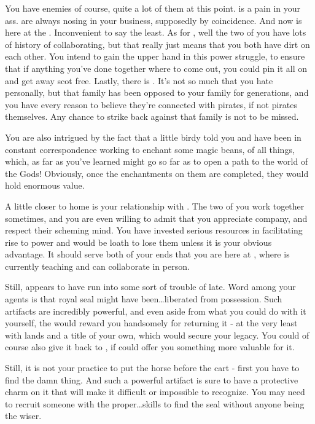 \documentclass[char]{GL2020}
\begin{document}
You have enemies of course, quite a lot of them at this point. \cInterpol{} is a pain in your ass. \cInterpol{\They} are always nosing in your business, supposedly by coincidence. And now \cInterpol{} is here at the \pSc{}. Inconvenient to say the least. As for \cDiplomat{}, well the two of you have lots of history of collaborating, but that really just means that you both have dirt on each other. You intend to gain the upper hand in this power struggle, to ensure that if anything you’ve done together where to come out, you could pin it all on \cDiplomat{} and get away scot free. Lastly, there is \cJuniorStatesman{}. It’s not so much that you hate \cJuniorStatesman{} personally, but that \cJuniorStatesman{\their} family has been opposed to your family for generations, and you have every reason to believe they’re connected with pirates, if not pirates themselves. Any chance to strike back against that family is not to be missed.

You are also intrigued by the fact that a little birdy told you \cCurse{} and \cFlowPriest{} have been in constant correspondence working to enchant some magic beans, of all things, which, as far as you’ve learned might go so far as to open a path to the world of the Gods!  Obviously, once the enchantments on them are completed, they would hold enormous value.

A little closer to home is your relationship with \cPrince{}. The two of you work together sometimes, and you are even willing to admit that you appreciate \cPrince{\their} company, and respect their scheming mind. You have invested serious resources in facilitating \cPrince{\their} rise to power and would be loath to lose them unless it is your obvious advantage. It should serve both of your ends that you are here at \pSchool{}, where \cPrince{} is currently teaching and can collaborate in person. 

Still, \cPrince{} appears to have run into some sort of trouble of late. Word among your agents is that \cPrince{\their} royal seal might have been\ldots liberated from \cPrince{\their} possession. Such artifacts are incredibly powerful, and even aside from what you could do with it yourself, the \cQueen{\Majesty} would reward you handsomely for returning it - at the very least with lands and a title of your own, which would secure your legacy. You could of course also give it back to \cPrince{}, if \cPrince{\they} could offer you something more valuable for it. 

Still, it is not your practice to put the horse before the cart - first you have to find the damn thing. And such a powerful artifact is sure to have a protective charm on it that will make it difficult or impossible to recognize. You may need to recruit someone with the proper\ldots skills to find the seal without anyone being the wiser.
\end{document}
